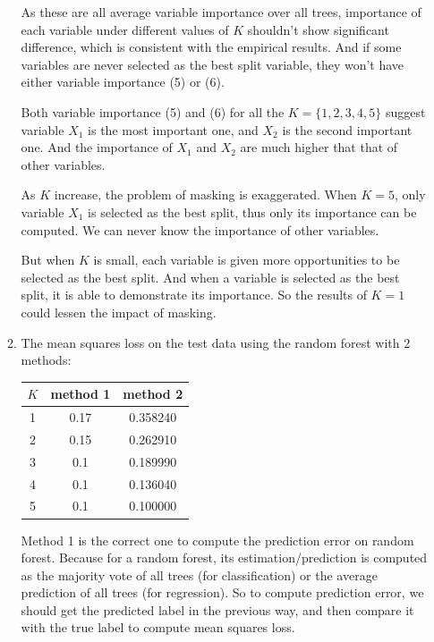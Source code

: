 \documentclass[paper=letter, fontsize=12pt]{article}
\begin{document}
\begin{enumerate}[label=(\alph*)]
\begin{enumerate}[label=(\roman*)]
		As these are all average variable importance over all trees, importance of each variable under different values of $K$ shouldn't show significant difference, which is consistent with the empirical results. And if some variables are never selected as the best split variable, they won't have either variable importance (5) or (6).
		
		Both variable importance (5) and (6) for all the $K = \{1, 2, 3, 4, 5\}$ suggest variable $X_1$ is the most important one, and $X_2$ is the second important one. And the importance of $X_1$ and $X_2$ are much higher that that of other variables.
		
		As $K$ increase, the problem of masking is exaggerated. When $K = 5$, only variable $X_1$ is selected as the best split, thus only its importance can be computed. We can never know the importance of other variables.
		
		But when $K$ is small, each variable is given more opportunities to be selected as the best split. And when a variable is selected as the best split, it is able to demonstrate its importance. So the results of $K = 1$ could lessen the impact of masking.
		
		\item The mean squares loss on the test data using the random forest with 2 methods:
		
		\begin{center}
			\begin{tabular}{|c|c|c|}
				\hline
				$K$ & method 1 & method 2 \\ \hline
				1 & 0.17  & 0.358240 \\ \hline
				2 & 0.15 & 0.262910 \\ \hline
				3 & 0.1 & 0.189990 \\ \hline
				4 & 0.1  & 0.136040 \\ \hline
				5 & 0.1  & 0.100000	 \\ \hline
			\end{tabular}
		\end{center}
		
		Method 1 is the correct one to compute the prediction error on random forest. Because for a random forest, its estimation/prediction is computed as the majority vote of all trees (for classification) or the average prediction of all trees (for regression). So to compute prediction error, we should get the predicted label in the previous way, and then compare it with the true label to compute mean squares loss.
	\end{enumerate}


\end{enumerate}
\end{document}
